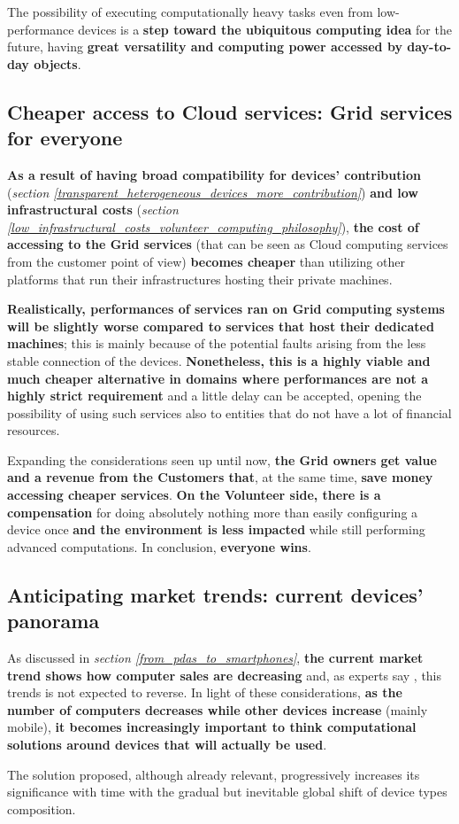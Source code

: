 The possibility of executing computationally heavy tasks even from low-performance devices is a \textbf{step toward the ubiquitous computing idea} for the future, having \textbf{great versatility and computing power accessed by day-to-day objects}.

\subsection{Cheaper access to Cloud services: Grid services for everyone}\label{cheaper_access_to_cloud_services}
\textbf{As a result of having broad compatibility for devices' contribution} (\textit{section \ref{transparent_heterogeneous_devices_more_contribution}}) \textbf{and low infrastructural costs} (\textit{section \ref{low_infrastructural_costs_volunteer_computing_philosophy}}), \textbf{the cost of accessing to the Grid services} (that can be seen as Cloud computing services from the customer point of view) \textbf{becomes cheaper} than utilizing other platforms that run their infrastructures hosting their private machines.

\textbf{Realistically, performances of services ran on Grid computing systems will be slightly worse compared to services that host their dedicated machines}; this is mainly because of the potential faults arising from the less stable connection of the devices. \textbf{Nonetheless, this is a highly viable and much cheaper alternative in domains where performances are not a highly strict requirement} and a little delay can be accepted, opening the possibility of using such services also to entities that do not have a lot of financial resources.

\vspace{10mm}
Expanding the considerations seen up until now, \textbf{the Grid owners get value and a revenue from the Customers that}, at the same time, \textbf{save money accessing cheaper services}. \textbf{On the Volunteer side, there is a compensation} for doing absolutely nothing more than easily configuring a device once \textbf{and the environment is less impacted} while still performing advanced computations. In conclusion, \textbf{everyone wins}. 

\subsection{Anticipating market trends: current devices' panorama}
As discussed in \textit{section \ref{from_pdas_to_smartphones}}, \textbf{the current market trend shows how computer sales are decreasing} and, as experts say \cite{smartphones_sales}, this trends is not expected to reverse. In light of these considerations, \textbf{as the number of computers decreases while other devices increase} (mainly mobile), \textbf{it becomes increasingly important to think computational solutions around devices that will actually be used}.

The solution proposed, although already relevant, progressively increases its significance with time with the gradual but inevitable global shift of device types composition.